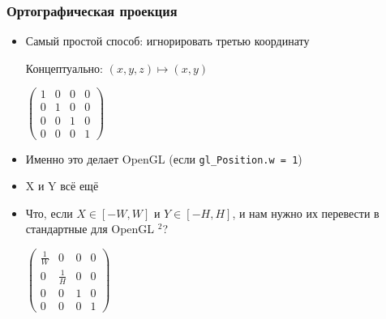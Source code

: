 \documentclass{beamer}
\begin{document}
\begin{frame}[fragile]
\frametitle{Ортографическая проекция}
\begin{itemize}
\item Самый простой способ: \pause игнорировать третью координату
\begin{center}Концептуально: \begin{math}(x, y, z) \mapsto (x, y)\end{math}\end{center}
\begin{center}
\begin{math}
\begin{pmatrix}
1 & 0 & 0 & 0 \\
0 & 1 & 0 & 0 \\
0 & 0 & 1 & 0 \\
0 & 0 & 0 & 1
\end{pmatrix}
\end{math}
\end{center}
\pause
\item Именно это делает OpenGL (если \verb|gl_Position.w = 1|)
\pause
\item X и Y всё ещё \begin{math}[-1, 1]\end{math}
\pause
\item Что, если \begin{math}X \in [-W, W]\end{math} и \begin{math}Y \in [-H, H]\end{math}, и нам нужно их перевести в стандартные для OpenGL \begin{math}[-1, 1]^2\end{math}?
\pause
\begin{center}
\begin{math}
\begin{pmatrix}
\frac{1}{W} & 0 & 0 & 0 \\
0 & \frac{1}{H} & 0 & 0 \\
0 & 0 & 1 & 0 \\
0 & 0 & 0 & 1
\end{pmatrix}
\end{math}
\end{center}
\end{itemize}
\end{frame}
\end{document}
